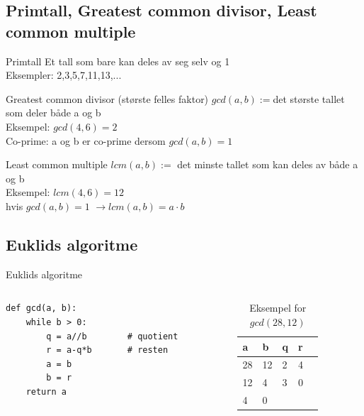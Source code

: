\subsection*{Primtall, Greatest common divisor, Least common multiple}
\begin{frame}
\begin{block}{Primtall}
Et tall som bare kan deles av seg selv og 1\\
Eksempler: 2,3,5,7,11,13,...
\end{block}
\pause
\begin{block}{Greatest common divisor (største felles faktor)}
$gcd(a,b) := $det største tallet som deler både a og b\\
Eksempel: $gcd(4,6)=2$\\
Co-prime: a og b er co-prime dersom $gcd(a,b)=1$
\end{block}
\pause
\begin{block}{Least common multiple}
$lcm(a,b) := $ det minste tallet som kan deles av både a og b\\
Eksempel: $lcm(4,6)=12$\\
hvis $gcd(a,b) = 1$ $\rightarrow lcm(a,b) = a\cdot b$
\end{block}
\end{frame}

\subsection*{Euklids algoritme}
\begin{frame}[fragile]{Euklids algoritme}
\begin{columns}
    \begin{column}{0.58\textwidth}
\begin{verbatim}
def gcd(a, b):
    while b > 0:
        q = a//b        # quotient
        r = a-q*b       # resten
        a = b
        b = r
    return a
\end{verbatim}
 	\end{column}
 	\pause
    \begin{column}{0.38\textwidth}
\begin{table}
\begin{tabular}{l|l|l|l|l}
a & b & q & r \\ \hline
28 & 12 & 2 & 4\\
12 & 4 & 3 & 0\\
4 & 0 &  & 
\end{tabular}
\caption{Eksempel for $gcd(28,12)$}
\end{table}
 	\end{column}
\end{columns}


\end{frame}

